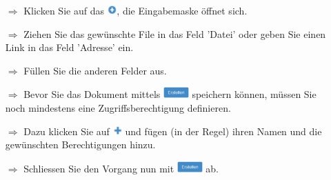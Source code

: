 \documentclass{article}
\begin{document}


\pagebreak
{}

\vspace{\baselineskip}


\begin{multicols}{2}

\begin{tcolorbox}[colback=blue!5,colframe=blue!40!black,title=Dokumente hochladen]
\begin{itemize}
  \item[$\Longrightarrow$] Klicken Sie auf das \includegraphics[height=10pt]{Icons/Plussymbol.jpg}, die Eingabemaske öffnet sich.
  \item[$\Longrightarrow$] Ziehen Sie das gewünschte File in das Feld 'Datei' oder geben Sie einen Link in das Feld 'Adresse' ein.
  \item[$\Longrightarrow$] Füllen Sie die anderen Felder aus.
  \item[$\Longrightarrow$] Bevor Sie das Dokument mittels \includegraphics[height=12pt]{Icons/B_Erstellen.jpg} speichern können, müssen Sie noch mindestens eine Zugriffsberechtigung definieren. 
	\item[$\Longrightarrow$] Dazu klicken Sie auf \includegraphics[height=10pt]{Icons/Pluszeichen.jpg} und fügen (in der Regel) ihren Namen und die gewünschten Berechtigungen hinzu.
	\item[$\Longrightarrow$] Schliessen Sie den Vorgang nun mit \includegraphics[height=12pt]{Icons/B_Erstellen.jpg} ab.
\end{itemize}
\end{tcolorbox}



\end{multicols}
\end{document}
